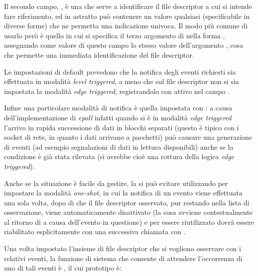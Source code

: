 

Il secondo campo, , è una  che serve a identificare il
file descriptor a cui si intende fare riferimento, ed in astratto può
contenere un valore qualsiasi (specificabile in diverse forme) che ne permetta
una indicazione univoca. Il modo più comune di usarlo però è quello in cui si
specifica il terzo argomento di  nella forma
, assegnando come valore di questo campo lo stesso valore
dell'argomento , cosa che permette una immediata identificazione del
file descriptor.


Le impostazioni di default prevedono che la notifica degli eventi richiesti
sia effettuata in modalità \textit{level triggered}, a meno che sul file
descriptor non si sia impostata la modalità \textit{edge triggered},
registrandolo con  attivo nel campo .  

Infine una particolare modalità di notifica è quella impostata con
: a causa dell'implementazione di \textit{epoll} infatti
quando si è in modalità \textit{edge triggered} l'arrivo in rapida successione
di dati in blocchi separati (questo è tipico con i socket di rete, in quanto i
dati arrivano a pacchetti) può causare una generazione di eventi (ad esempio
segnalazioni di dati in lettura disponibili) anche se la condizione è già
stata rilevata (si avrebbe cioè una rottura della logica \textit{edge
  triggered}).

Anche se la situazione è facile da gestire, la si può evitare utilizzando
 per impostare la modalità \textit{one-shot}, in cui la
notifica di un evento viene effettuata una sola volta, dopo di che il file
descriptor osservato, pur restando nella lista di osservazione, viene
automaticamente disattivato (la cosa avviene contestualmente al ritorno di
 a causa dell'evento in questione) e per essere riutilizzato
dovrà essere riabilitato esplicitamente con una successiva chiamata con
.

Una volta impostato l'insieme di file descriptor che si vogliono osservare con
i relativi eventi, la funzione di sistema che consente di attendere
l'occorrenza di uno di tali eventi è , il cui prototipo è:

